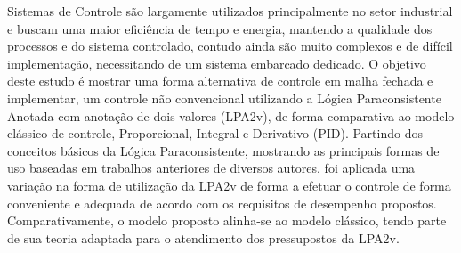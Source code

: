





Sistemas de Controle são largamente utilizados principalmente no setor industrial e buscam uma maior eficiência de tempo e energia, mantendo a qualidade dos processos e do sistema controlado, 
contudo ainda são muito complexos e de difícil implementação, necessitando de um sistema embarcado dedicado.
O objetivo deste estudo é mostrar uma forma alternativa de controle em malha fechada e implementar, um controle não convencional utilizando a Lógica Paraconsistente Anotada com anotação de dois valores (LPA2v), 
de forma comparativa ao modelo clássico de controle, Proporcional, Integral e Derivativo (PID).
Partindo dos conceitos básicos da Lógica Paraconsistente, 
mostrando as principais formas de uso baseadas em 
trabalhos anteriores de diversos autores, 
foi aplicada uma variação na forma de utilização da LPA2v 
de forma a efetuar o controle de forma conveniente e adequada 
de acordo com os requisitos de desempenho propostos.
Comparativamente, o modelo proposto alinha-se ao modelo clássico, tendo parte de sua teoria adaptada para o atendimento dos pressupostos da LPA2v.
		

